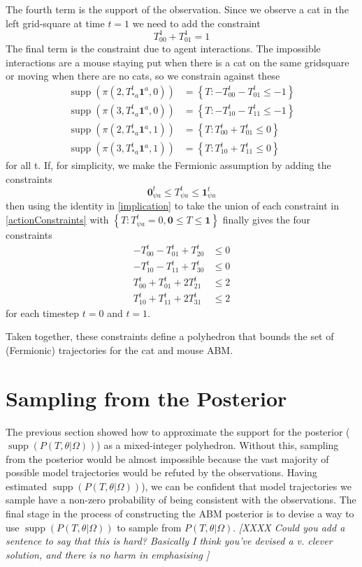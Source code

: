 \documentclass{article}
\DeclareMathOperator\supp{supp}
\begin{document}
The fourth term is the support of the observation. Since we observe a cat in the left grid-square at time $t=1$ we need to add the constraint
\[
T^1_{0 0} + T^1_{0 1} = 1
\]
The final term is the constraint due to agent interactions. The impossible interactions are a mouse staying put when there is a cat on the same gridsquare or moving when there are no cats, so we constrain against these
\begin{equation}
\begin{aligned}
\supp(\pi(2,T^t_{* a}\mathbf{1}^a,0)) &= \left\{ T: -T^t_{0 0} - T^t_{0 1} \le -1 \right\}\\
\supp(\pi(3,T^t_{* a}\mathbf{1}^a,0)) &= \left\{ T: -T^t_{1 0} - T^t_{1 1} \le -1 \right\}\\
\supp(\pi(2,T^t_{* a}\mathbf{1}^a,1)) &= \left\{ T: T^t_{0 0} + T^t_{0 1} \le 0 \right\}\\
\supp(\pi(3,T^t_{* a}\mathbf{1}^a,1)) &= \left\{ T: T^t_{1 0} + T^t_{1 1} \le 0 \right\}
\end{aligned}
\label{actionConstraints}
\end{equation}
for all t. If, for simplicity, we make the Fermionic assumption by adding the constraints
\[
\mathbf{0}^t_{\psi a} \le T^t_{\psi a} \le \mathbf{1}^t_{\psi a}
\]
then using the identity in \eqref{implication} to take the union of each constraint in \eqref{actionConstraints} with $\left\{T: T^t_{\psi a} = 0, \mathbf{0} \le T \le \mathbf{1}\right\}$ finally gives the four constraints
\[
\begin{aligned}
-T^t_{0 0} - T^t_{0 1} + T^t_{2 0} & \le 0\\
-T^t_{1 0} - T^t_{1 1} + T^t_{3 0} & \le 0\\
T^t_{0 0} + T^t_{0 1} + 2T^t_{2 1} & \le 2 \\
T^t_{1 0} + T^t_{1 1} + 2T^t_{3 1} & \le 2
\end{aligned}
\]
for each timestep $t=0$ and $t=1$.

Taken together, these constraints define a polyhedron that bounds the set of (Fermionic) trajectories for the cat and mouse ABM.

\section{Sampling from the Posterior}\label{sec:posterior_sampling}

The previous section showed how to approximate the support for the posterior ($\supp(P(T,\theta|\Omega))$) as a mixed-integer polyhedron. Without this, sampling from the posterior would be almost impossible because the vast majority of possible model trajectories would be refuted by the observations. Having estimated $\supp(P(T,\theta|\Omega))$), we can be confident that model trajectories we sample have a non-zero probability of being consistent with the observations. The final stage in the process of constructing the ABM posterior is to devise a way to use $\supp(P(T,\theta|\Omega))$ to sample from $P(T,\theta|\Omega)$. \textit{[XXXX Could you add a sentence to say that this is hard? Basically I think you've devised a v. clever solution, and there is no harm in emphasising ]}
\end{document}
